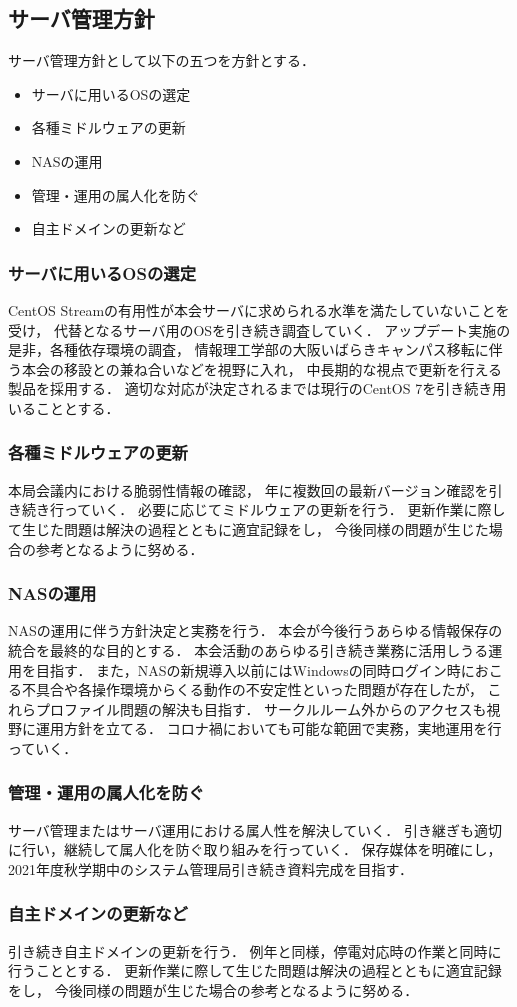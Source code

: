 \subsection*{サーバ管理方針}


サーバ管理方針として以下の五つを方針とする．
\begin{itemize}
    \item サーバに用いるOSの選定
    \item 各種ミドルウェアの更新
    \item NASの運用
    \item 管理・運用の属人化を防ぐ
    \item 自主ドメインの更新など
\end{itemize}

\subsubsection*{サーバに用いるOSの選定}
CentOS Streamの有用性が本会サーバに求められる水準を満たしていないことを受け，
代替となるサーバ用のOSを引き続き調査していく．
アップデート実施の是非，各種依存環境の調査，
情報理工学部の大阪いばらきキャンパス移転に伴う本会の移設との兼ね合いなどを視野に入れ，
中長期的な視点で更新を行える製品を採用する．
適切な対応が決定されるまでは現行のCentOS 7を引き続き用いることとする．

\subsubsection*{各種ミドルウェアの更新}
本局会議内における脆弱性情報の確認，
年に複数回の最新バージョン確認を引き続き行っていく．
必要に応じてミドルウェアの更新を行う．
更新作業に際して生じた問題は解決の過程とともに適宜記録をし，
今後同様の問題が生じた場合の参考となるように努める．

\subsubsection*{NASの運用}
NASの運用に伴う方針決定と実務を行う．
本会が今後行うあらゆる情報保存の統合を最終的な目的とする．
本会活動のあらゆる引き続き業務に活用しうる運用を目指す．
また，NASの新規導入以前にはWindowsの同時ログイン時におこる不具合や各操作環境からくる動作の不安定性といった問題が存在したが，
これらプロファイル問題の解決も目指す．
サークルルーム外からのアクセスも視野に運用方針を立てる．
コロナ禍においても可能な範囲で実務，実地運用を行っていく．

\subsubsection*{管理・運用の属人化を防ぐ}
サーバ管理またはサーバ運用における属人性を解決していく．
引き継ぎも適切に行い，継続して属人化を防ぐ取り組みを行っていく．
保存媒体を明確にし，2021年度秋学期中のシステム管理局引き続き資料完成を目指す．

\subsubsection*{自主ドメインの更新など}
引き続き自主ドメインの更新を行う．
例年と同様，停電対応時の作業と同時に行うこととする．
更新作業に際して生じた問題は解決の過程とともに適宜記録をし，
今後同様の問題が生じた場合の参考となるように努める．

